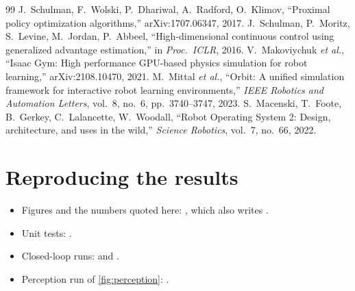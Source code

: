 \documentclass[11pt]{article}
\begin{document}
\begin{thebibliography}{99}
 J.~Schulman, F.~Wolski, P.~Dhariwal, A.~Radford, O.~Klimov, ``Proximal policy optimization
algorithms,'' arXiv:1707.06347, 2017.
 J.~Schulman, P.~Moritz, S.~Levine, M.~Jordan, P.~Abbeel, ``High-dimensional continuous
control using generalized advantage estimation,'' in \emph{Proc.\ ICLR}, 2016.
 V.~Makoviychuk \emph{et al.}, ``Isaac Gym: High performance GPU-based physics simulation
for robot learning,'' arXiv:2108.10470, 2021.
 M.~Mittal \emph{et al.}, ``Orbit: A unified simulation framework for interactive robot
learning environments,'' \emph{IEEE Robotics and Automation Letters}, vol.~8, no.~6, pp.~3740--3747, 2023.
 S.~Macenski, T.~Foote, B.~Gerkey, C.~Lalancette, W.~Woodall, ``Robot Operating System 2:
Design, architecture, and uses in the wild,'' \emph{Science Robotics}, vol.~7, no.~66, 2022.
\end{thebibliography}

\appendix
\section{Reproducing the results}
\begin{itemize}[before=\sloppy]
  \item Figures and the numbers quoted here: , which also writes
        .
  \item Unit tests: .
  \item Closed-loop runs:  and .
  \item Perception run of \cref{fig:perception}:
        .
\end{itemize}
\end{document}
